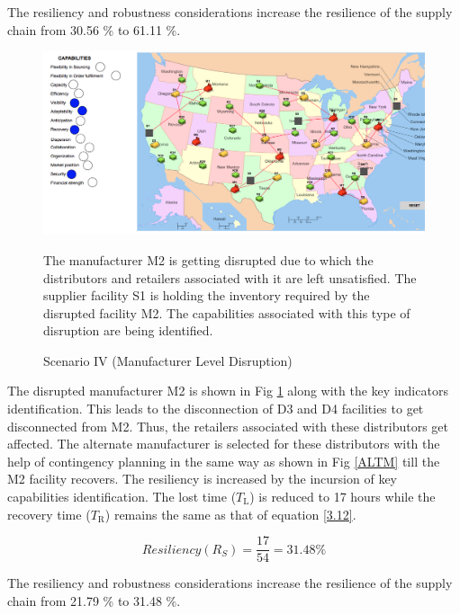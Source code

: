 The resiliency and robustness considerations increase the resilience of the supply chain from 30.56 \% to 61.11 \%.

\begin{figure}[H]
  \centering
  \includegraphics[width=6.5in]{figures/pdf/S4MLD.png}\\
  \caption{Scenario IV (Manufacturer Level Disruption)}
  {The manufacturer M2 is getting disrupted due to which the  distributors and retailers associated with it are left unsatisfied. The supplier facility S1 is holding the inventory required by the disrupted facility M2. The capabilities associated with this type of disruption are being identified.}
  \label{S4ML}
\end{figure}   

The disrupted manufacturer M2 is shown in Fig \ref{S4ML} along with the key indicators identification. This leads to the disconnection of D3 and D4 facilities to get disconnected from M2. Thus, the retailers associated with these distributors get affected. The alternate manufacturer is selected for these distributors with the help of contingency planning in the same way as shown in Fig \ref{ALTM} till the M2 facility recovers. The resiliency is increased by the incursion of key capabilities identification. The lost time ($T_{\text{L}}$) is reduced to 17 hours while the recovery time ($T_{\text{R}}$) remains the same as that of equation \ref{3.12}. 

\begin{equation}
    Resiliency(R_S) = \frac{17}{54} = 31.48 \% \label{3.27}
\end{equation}

The resiliency and robustness considerations increase the resilience of the supply chain from 21.79 \% to 31.48 \%.

